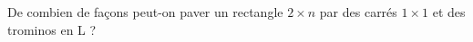De combien de façons peut-on paver un rectangle $2 \times n$ par des carrés $1 \times 1$ et des trominos en L ?
